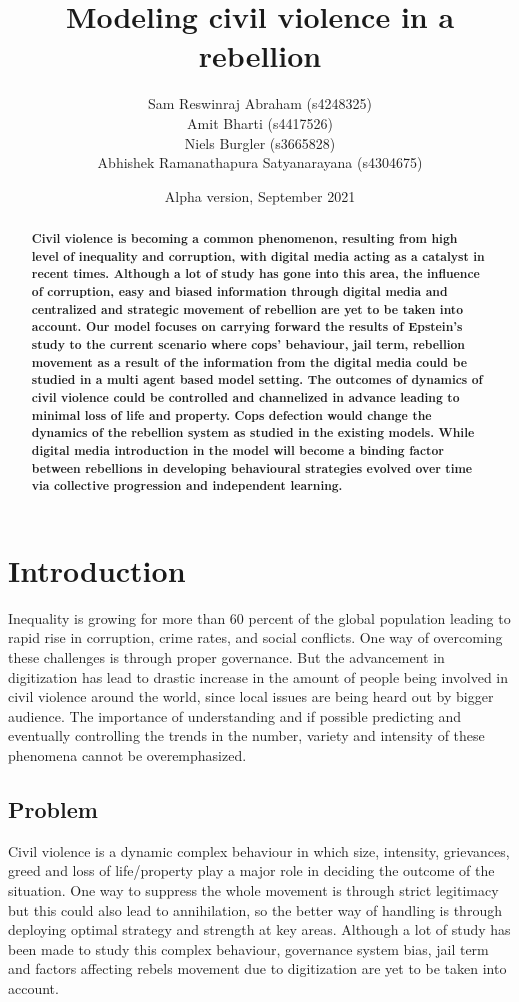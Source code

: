 \documentclass[a4paper,11pt]{article}
\title{Modeling civil violence in a rebellion}
\author{
  Sam Reswinraj Abraham (s4248325)
  \\
  Amit Bharti (s4417526)
  \\
  Niels Burgler (s3665828)
  \\
  Abhishek Ramanathapura Satyanarayana (s4304675)
}
\date{Alpha version, September 2021} %
\begin{document}
\maketitle

\begin{abstract}
\textbf{Civil violence is becoming a common phenomenon, resulting from high level of inequality and corruption, with digital media acting as a catalyst in recent times. Although a lot of study has gone into this area, the influence of corruption, easy and biased information through digital media and centralized and strategic movement of rebellion are yet to be taken into account. Our model focuses on carrying forward the results of Epstein's \cite{epstein2002modeling} study to the current scenario where cops' behaviour, jail term, rebellion movement as a result of the information from the digital media could be studied in a multi agent based model setting. The outcomes of dynamics of civil violence could be controlled and channelized in advance leading to minimal loss of life and property. Cops defection would change the dynamics of the rebellion system as studied in the existing models. While digital media introduction in the model will become a binding factor between rebellions in developing behavioural strategies evolved over time via collective progression and independent
learning.}  
\end{abstract}

\section{Introduction}
Inequality is growing for more than 60 percent of the global population leading to rapid rise in corruption, crime rates, and social conflicts. One way of overcoming these challenges is through proper governance. But the advancement in digitization has lead to drastic increase in the amount of people being involved in civil violence around the world, since local issues are being heard out by bigger audience. The importance of understanding and if possible predicting and eventually controlling the trends in the number, variety and intensity of these phenomena cannot be overemphasized.

\subsection{Problem}
Civil violence is a dynamic complex behaviour in which size, intensity, grievances, greed and loss of life/property play a major role in deciding the outcome of the situation. One way to suppress the whole movement is through strict legitimacy but this could also lead to annihilation, so the better way of handling is through deploying optimal strategy and strength at key areas. Although a lot of study has been made to study this complex behaviour, governance system bias, jail term and factors affecting rebels movement due to digitization are yet to be taken into account.
\end{document}
